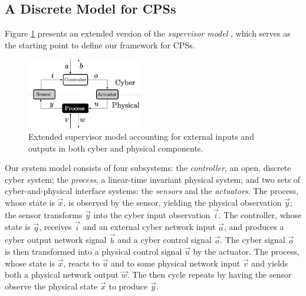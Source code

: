 \subsection{A Discrete Model for CPSs}
Figure \ref{fig:IFCPS} presents an extended version of the \emph{supervisor model} \cite{doi:10.1137/0325013}, which serves as the starting point to define our framework for CPSs. 
\begin{figure}
\centering
\includegraphics[width=0.45\textwidth]{Figures/IFCPS}
\caption{Extended supervisor model accounting for external inputs and outputs in both cyber and physical components.}
\label{fig:IFCPS}
\end{figure}
Our system model consists of four subsystems: the \emph{controller}, an open, discrete cyber system; the \emph{process}, a linear-time invariant physical system; and two sets of cyber-and-physical interface systems: the \emph{sensors} and the \emph{actuators}. The process, whose state is $\vec{x}$, is observed by the sensor, yielding the physical observation $\vec{y}$; the sensor transforms $\vec{y}$ into the cyber input observation $\vec{i}$. The controller, whose state is $\vec{q}$, receives $\vec{i}$ and an external cyber network input $\vec{a}$, and produces a cyber output network signal $\vec{b}$ and a cyber control signal $\vec{o}$. The cyber signal $\vec{o}$ is then transformed into a physical control signal $\vec{u}$ by the actuator. The process, whose state is $\vec{x}$, reacts to $\vec{u}$ and to some physical network input $\vec{v}$ and yields both a physical network output $\vec{w}$. The then cycle repeats by having the sensor observe the physical state $\vec{x}$ to produce $\vec{y}$. 

